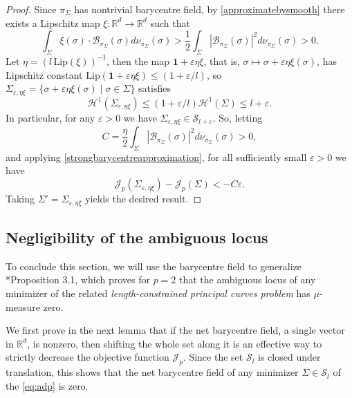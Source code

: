 \documentclass[preprint, reqno]{amsart}
\renewcommand{\epsilon}{\varepsilon}
\theoremstyle{definition}
\numberwithin{equation}{section}
\begin{document}
\begin{proof}
  Since $\pi_{\Sigma}$ has nontrivial barycentre field, by
  \cref{approximatebysmooth} there exists a Lipschitz map $\xi :
  \mathbb{R}^d \to \mathbb{R}^d$ such that
  \[
    \int_{\Sigma} \xi(\sigma) \cdot \mathcal{B}_{\pi_{\Sigma}}(\sigma)
    d\nu_{\pi_{\Sigma}} (\sigma) >
    \frac{1}{2}\int_{\Sigma}|\mathcal{B}_{\pi_{\Sigma}}(\sigma)|^2
    d\nu_{\pi_{\Sigma}} (\sigma) > 0.
  \]
  Let $\eta = (l \, \mathrm{Lip}(\xi))^{-1}$, then the map $\mathbf{1}
  + \epsilon \eta \xi$, that is, $\sigma \mapsto \sigma + \epsilon
  \eta \xi(\sigma)$, has Lipschitz constant $\mathrm{Lip}(\mathbf{1} +
  \epsilon \eta \xi) \le (1+\epsilon/l)$, so $\Sigma_{\epsilon,
    \eta\xi} = \{\sigma + \epsilon \eta \xi(\sigma) \mid \sigma \in
  \Sigma\}$ satisfies
  \[
    \mathcal{H}^1(\Sigma_{\epsilon, \eta \xi}) \le (1+\epsilon/l)
    \mathcal{H}^1 (\Sigma) \leq l + \epsilon.
  \]
  In particular, for any $\epsilon > 0$ we have $\Sigma_{\epsilon,
    \eta \xi} \in \mathcal{S}_{l + \epsilon}$. So, letting
  \[
    C =
    \frac{\eta}{2}\int_{\Sigma}|\mathcal{B}_{\pi_{\Sigma}}(\sigma)|^2
    d\nu_{\pi_{\Sigma}} (\sigma) > 0,
  \]
  and applying \cref{strongbarycentreapproximation}, for all
  sufficiently small $\epsilon > 0$ we have
  \[
    \mathscr{J}_p(\Sigma_{\epsilon, \eta \xi}) - \mathscr{J}_p(\Sigma)
    < -C \epsilon.
  \]
  Taking $\Sigma' = \Sigma_{\epsilon, \eta \xi}$ yields the
  desired result.
\end{proof}


\subsection{Negligibility of the ambiguous
  locus}\label{sec:negligibilityofambiguouslocus}

To conclude this section, we will use the barycentre field to
generalize \cite{Delattre17}*{Proposition 3.1}, which proves for $p=2$
that the ambiguous locus of any minimizer of the related
\textit{length-constrained principal curves problem} has $\mu$-measure
zero.

We first prove in the next lemma that if the net barycentre field, a
single vector in $\mathbb R^d$, is nonzero, then shifting the whole
set along it is an effective way to strictly decrease the objective
function $\mathscr J_p$. Since the set $\mathcal{S}_l$ is closed under
translation, this shows that the net barycentre field of any minimizer
$\Sigma \in \mathcal{S}_l$ of the \eqref{eq:adp} is zero.
\end{document}
